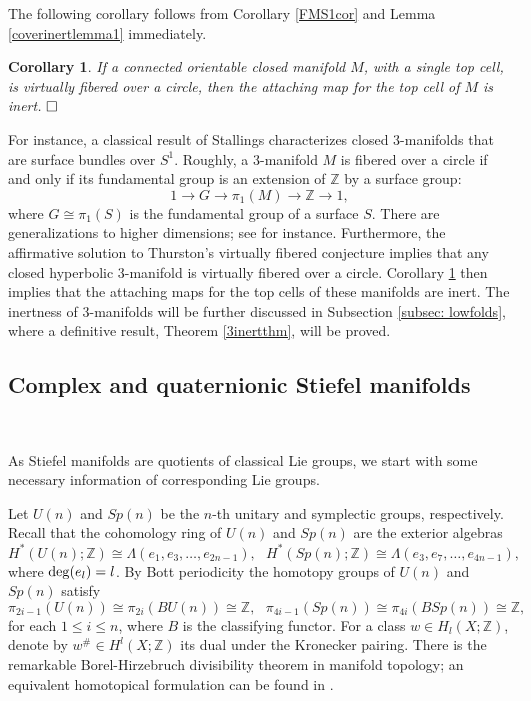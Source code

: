 \documentclass[a4]{amsart}
\newtheorem{corollary}[theorem]{Corollary}
\theoremstyle{definition}
\newcommand{\qqed}{\hfill\Box}
\begin{document}
\begin{sloppypar}
The following corollary follows from Corollary \ref{FMS1cor} and Lemma \ref{coverinertlemma1} immediately.     
\begin{corollary}\label{fibering-inert-cor}
If a connected orientable closed manifold $M$, with a single top cell, is virtually fibered over a circle, then the attaching map for the top cell of $M$ is inert. $\qqed$
\end{corollary}
For instance, a classical result of Stallings \cite{Sta61} characterizes closed $3$-manifolds that  are surface bundles over $S^1$. Roughly, a $3$-manifold $M$ is fibered over a circle if and only if its fundamental group is an extension of $\mathbb{Z}$ by a surface group: 
\[
1\stackrel{}{\longrightarrow}G\stackrel{}{\longrightarrow}\pi_1(M)\stackrel{}{\longrightarrow} \mathbb{Z}\stackrel{}{\longrightarrow} 1,
\]
where $G\cong \pi_1(S)$ is the fundamental group of a surface $S$. 
There are generalizations to higher dimensions; see \cite{BL66, Far71, Sie70, FS14, QSW23} for instance. 
Furthermore, the affirmative solution to Thurston's virtually fibered conjecture \cite{Ago13, PW18} implies that any closed hyperbolic $3$-manifold is virtually fibered over a circle. 
Corollary \ref{fibering-inert-cor} then implies that the attaching maps for the top cells of these manifolds are inert. 
The inertness of $3$-manifolds will be further discussed in Subsection \ref{subsec: lowfolds}, where a definitive result, Theorem \ref{3inertthm}, will be proved.  



\subsection{Complex and quaternionic Stiefel manifolds}
\label{subsec: stiefel}

$\, $

As Stiefel manifolds are quotients of classical Lie groups, we start with some necessary information of corresponding Lie groups. 

Let $U(n)$ and $Sp(n)$ be the $n$-th unitary and symplectic groups, respectively. 
Recall that the cohomology ring of $U(n)$ and $Sp(n)$ are the exterior algebras
\[
H^\ast(U(n);\mathbb{Z})\cong \Lambda (e_1, e_3,\ldots, e_{2n-1}), \ \ \ 
H^\ast(Sp(n);\mathbb{Z})\cong \Lambda (e_3, e_7,\ldots, e_{4n-1}),
\]
where ${\rm deg}(e_l)=l$. By Bott periodicity the homotopy groups of $U(n)$ and $Sp(n)$ satisfy 
\[
\pi_{2i-1}(U(n))\cong \pi_{2i}(BU(n))\cong \mathbb{Z}, \ \ \ \pi_{4i-1}(Sp(n))\cong \pi_{4i}(BSp(n))\cong\mathbb{Z}, 
\]
for each $1\leq i\leq n$, where $B$ is the classifying functor. 
For a class $w\in H_l(X;\mathbb{Z})$, denote by $w^\#\in H^l(X;\mathbb{Z})$ its dual under the Kronecker pairing. 
There is the remarkable Borel-Hirzebruch divisibility theorem \cite[Section 26.10]{BH59} in manifold topology; an equivalent homotopical formulation can be found in \cite[Theorem 6.13]{MT91}. 
  


\end{sloppypar}
\end{document}
